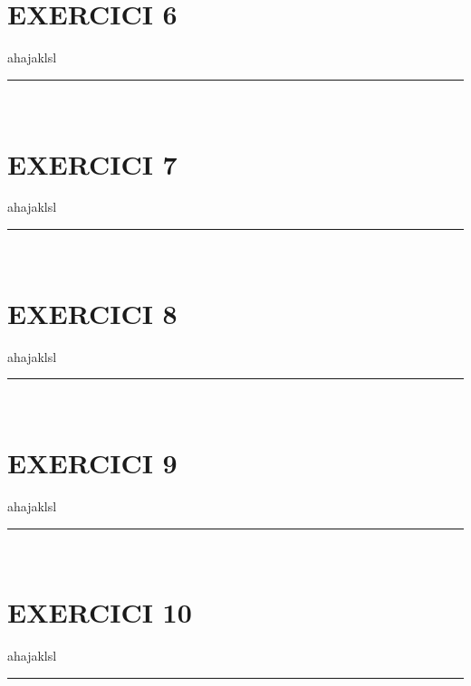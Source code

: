 \documentclass[a4paper, 11pt]{article}
\begin{document}

\section*{EXERCICI 6}
\noindent ahajaklsl
\vspace{10mm}
\hrule\
\vspace{5mm}


\section*{EXERCICI 7}
\noindent ahajaklsl
\vspace{10mm}
\hrule\
\vspace{5mm}


\section*{EXERCICI 8}
\noindent ahajaklsl
\vspace{10mm}
\hrule\
\vspace{5mm}


\section*{EXERCICI 9}
\noindent ahajaklsl
\vspace{10mm}
\hrule\
\vspace{5mm}


\section*{EXERCICI 10}
\noindent ahajaklsl
\vspace{10mm}
\hrule\
\vspace{5mm}


























\newpage
\printbibliography
\end{document}
